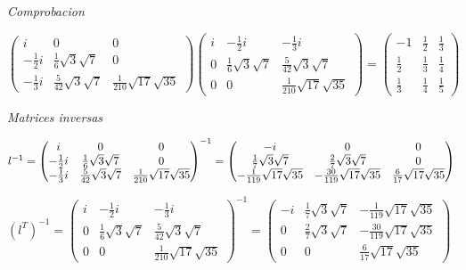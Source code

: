 \documentclass{article}
\begin{document}
\bigskip \textit{Comprobacion}

$%
\begin{pmatrix}
\allowbreak i & 0 & 0 \\ 
-\frac{1}{2}i & \frac{1}{6}\sqrt{3}\sqrt{7} & 0 \\ 
-\frac{1}{3}i & \frac{5}{42}\sqrt{3}\sqrt{7} & \allowbreak \frac{1}{210}%
\sqrt{17}\sqrt{35}%
\end{pmatrix}%
\begin{pmatrix}
i & -\frac{1}{2}i & -\frac{1}{3}i \\ 
0 & \frac{1}{6}\sqrt{3}\sqrt{7} & \frac{5}{42}\sqrt{3}\sqrt{7} \\ 
0 & 0 & \frac{1}{210}\sqrt{17}\sqrt{35}%
\end{pmatrix}%
=\allowbreak 
\begin{pmatrix}
-1 & \frac{1}{2} & \frac{1}{3} \\ 
\frac{1}{2} & \frac{1}{3} & \frac{1}{4} \\ 
\frac{1}{3} & \frac{1}{4} & \frac{1}{5}%
\end{pmatrix}%
$

\bigskip \textit{Matrices inversas}

$l^{-1}=%
\begin{pmatrix}
\allowbreak i & 0 & 0 \\ 
-\frac{1}{2}i & \frac{1}{6}\sqrt{3}\sqrt{7} & 0 \\ 
-\frac{1}{3}i & \frac{5}{42}\sqrt{3}\sqrt{7} & \allowbreak \frac{1}{210}%
\sqrt{17}\sqrt{35}%
\end{pmatrix}%
^{-1}=\allowbreak 
\begin{pmatrix}
-i & 0 & 0 \\ 
\frac{1}{7}\sqrt{3}\sqrt{7} & \frac{2}{7}\sqrt{3}\sqrt{7} & 0 \\ 
-\frac{1}{119}\sqrt{17}\sqrt{35} & -\frac{30}{119}\sqrt{17}\sqrt{35} & \frac{%
6}{17}\sqrt{17}\sqrt{35}%
\end{pmatrix}%
\allowbreak $

$(l^{T})^{-1}=%
\begin{pmatrix}
i & -\frac{1}{2}i & -\frac{1}{3}i \\ 
0 & \frac{1}{6}\sqrt{3}\sqrt{7} & \frac{5}{42}\sqrt{3}\sqrt{7} \\ 
0 & 0 & \frac{1}{210}\sqrt{17}\sqrt{35}%
\end{pmatrix}%
^{-1}=\allowbreak 
\begin{pmatrix}
-i & \frac{1}{7}\sqrt{3}\sqrt{7} & -\frac{1}{119}\sqrt{17}\sqrt{35} \\ 
0 & \frac{2}{7}\sqrt{3}\sqrt{7} & -\frac{30}{119}\sqrt{17}\sqrt{35} \\ 
0 & 0 & \frac{6}{17}\sqrt{17}\sqrt{35}%
\end{pmatrix}%
\allowbreak $
\end{document}

